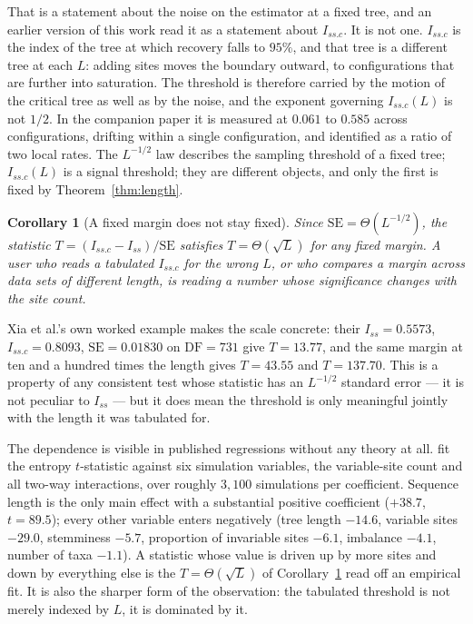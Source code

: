 \documentclass[11pt]{article}
\newcommand{\Iss}{I_{ss}}
\newcommand{\Issc}{I_{ss.c}}
\newtheorem{corollary}[theorem]{Corollary}
\theoremstyle{definition}
\theoremstyle{remark}
\begin{document}
That is a statement about the noise on the estimator at a fixed tree, and an
earlier version of this work read it as a statement about $\Issc$. It is not
one. $\Issc$ is the index of the tree at which recovery falls to $95\%$, and
that tree is a different tree at each $L$: adding sites moves the boundary
outward, to configurations that are further into saturation. The threshold is
therefore carried by the motion of the critical tree as well as by the noise,
and the exponent governing $\Issc(L)$ is not $1/2$. In the companion paper
\citep{xu2026part2} it is measured at $0.061$ to $0.585$ across
configurations, drifting within a single configuration, and identified as a
ratio of two local rates. The $L^{-1/2}$ law describes the sampling threshold
of a fixed tree; $\Issc(L)$ is a signal threshold; they are different objects,
and only the first is fixed by Theorem~\ref{thm:length}.

\begin{corollary}[A fixed margin does not stay fixed]
\label{cor:length}
Since $\mathrm{SE}=\Theta(L^{-1/2})$, the statistic
$T=(\Issc-\Iss)/\mathrm{SE}$ satisfies $T=\Theta(\sqrt L)$ for any
\emph{fixed} margin. A user who reads a tabulated $\Issc$ for the wrong $L$,
or who compares a margin across data sets of different length, is reading a
number whose significance changes with the site count.
\end{corollary}

Xia et al.'s own worked example makes the scale concrete: their
$\Iss=0.5573$, $\Issc=0.8093$, $\mathrm{SE}=0.01830$ on $\mathrm{DF}=731$ give
$T=13.77$, and the same margin at ten and a hundred times the length gives
$T=43.55$ and $T=137.70$. This is a property of any consistent test whose
statistic has an $L^{-1/2}$ standard error --- it is not peculiar to $\Iss$ ---
but it does mean the threshold is only meaningful jointly with the length it
was tabulated for.

The dependence is visible in published regressions without any theory at all.
\citet{duchene2022saturation} fit the entropy $t$-statistic against six
simulation variables, the variable-site count and all two-way interactions,
over roughly $3{,}100$ simulations per coefficient. Sequence length is the
only main effect with a substantial positive coefficient ($+38.7$,
$t=89.5$); every other variable enters negatively (tree length $-14.6$,
variable sites $-29.0$, stemminess $-5.7$, proportion of invariable sites
$-6.1$, imbalance $-4.1$, number of taxa $-1.1$). A statistic whose value is
driven up by more sites and down by everything else is the $T=\Theta(\sqrt L)$
of Corollary~\ref{cor:length} read off an empirical fit. It is also the
sharper form of the observation: the tabulated threshold is not merely
indexed by $L$, it is dominated by it.
\end{document}

